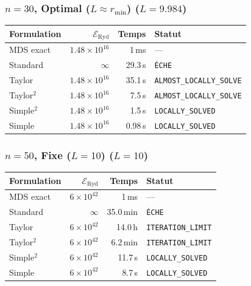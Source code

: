 \subsubsection{$n=30$, Optimal ($L{\approx}r_{\min}$) ($L=9.984$)}
\begin{longtable}{@{}lrrl@{}}
  \toprule
  Formulation & $\mathcal{E}_{\mathrm{Ryd}}$ & Temps & Statut \\
  \midrule
  \endhead
  MDS exact & $1.48\times10^{16}$ & 1\,ms & --- \\
  Standard & $\infty$ & 29.3\,s & \texttt{ÉCHE} \\
  Taylor & $1.48\times10^{16}$ & 35.1\,s & \texttt{ALMOST\_LOCALLY\_SOLVE} \\
  Taylor$^2$ & $1.48\times10^{16}$ & 7.5\,s & \texttt{ALMOST\_LOCALLY\_SOLVE} \\
  Simple$^2$ & $1.48\times10^{16}$ & 1.5\,s & \texttt{LOCALLY\_SOLVED} \\
  Simple & $1.48\times10^{16}$ & 0.98\,s & \texttt{LOCALLY\_SOLVED} \\
  \bottomrule
\end{longtable}

\subsubsection{$n=50$, Fixe ($L{=}10$) ($L=10$)}
\begin{longtable}{@{}lrrl@{}}
  \toprule
  Formulation & $\mathcal{E}_{\mathrm{Ryd}}$ & Temps & Statut \\
  \midrule
  \endhead
  MDS exact & $6\times10^{42}$ & 1\,ms & --- \\
  Standard & $\infty$ & 35.0\,min & \texttt{ÉCHE} \\
  Taylor & $6\times10^{42}$ & 14.0\,h & \texttt{ITERATION\_LIMIT} \\
  Taylor$^2$ & $6\times10^{42}$ & 6.2\,min & \texttt{ITERATION\_LIMIT} \\
  Simple$^2$ & $6\times10^{42}$ & 11.7\,s & \texttt{LOCALLY\_SOLVED} \\
  Simple & $6\times10^{42}$ & 8.7\,s & \texttt{LOCALLY\_SOLVED} \\
  \bottomrule
\end{longtable}

